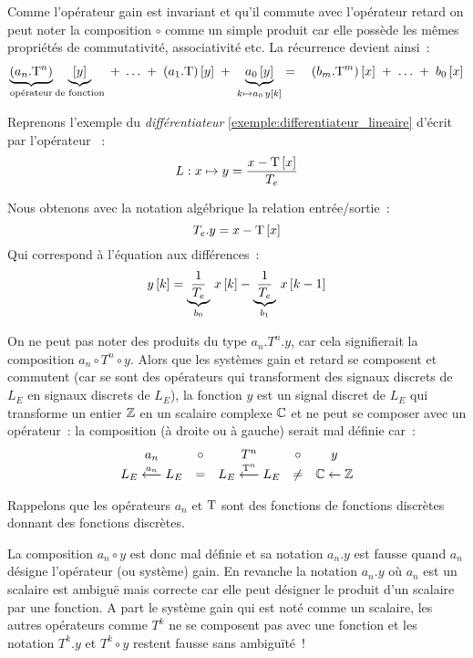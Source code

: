 Comme l'opérateur gain est invariant et qu'il commute avec l'opérateur
retard on peut noter la composition $\circ$ comme un simple produit
car elle possède les mêmes propriétés de commutativité, associativité
etc. La récurrence devient ainsi~:
\begin{eqnarray}
 \underbrace{\left(a_n.\mathrm{T}^n\right)}_{\text{opérateur}}\underbrace{\left[y\right]}_{\text{de fonction}}\; +\; \ldots \;+\; \left(a_1.\mathrm{T}\right)\left[y\right] \;+\; \underbrace{a_0\left[y\right]}_{k\mapsto a_0\,y\left[k\right]}  = \quad \left(b_m.\mathrm{T}^m\right)\left[x\right] \;+\; \ldots \;+\; b_0\left[x\right]
\end{eqnarray}

\begin{exemple}
  Reprenons l'exemple du \emph{différentiateur} \ref{exemple:differentiateur_lineaire} d'écrit par l'opérateur ~: $$L : x \mapsto y=\frac{x-\mathrm{T}\left[x\right]}{T_e}$$
  
  Nous obtenons avec la notation algébrique la relation entrée/sortie~:
  $$
  T_e.y = x - \mathrm{T}\left[x\right]
  $$
  Qui correspond à l'équation aux différences~:
  $$
  y\left[k\right] = \underbrace{\frac{1}{T_e}}_{b_0}\,x\left[k\right]-\underbrace{\frac{1}{T_e}}_{b_1}\,x\left[k-1\right]
  $$
  
\end{exemple}

\begin{remarque}
  On ne peut pas noter des produits du type $a_n.T^n.y$, car cela
  signifierait la composition $a_n\circ T^n\circ y$. Alors que les
  systèmes gain et retard se composent et commutent (car se sont des
  opérateurs qui transforment des signaux discrets de $L_E$ en signaux
  discrets de $L_E$), la fonction $y$ est un signal discret de $L_E$
  qui transforme un entier $\mathbb{Z}$ en un scalaire complexe $\mathbb{C}$ et ne
  peut se composer avec un opérateur~: la composition (à droite ou à
  gauche) serait mal définie car~:
  \begin{equation*}
    \begin{array}{ccccc}
      a_n   & \circ &   T^n  & \circ &  y \\
      L_E \overset{a_n}{\longleftarrow} L_E & =  & L_E \overset{\mathrm{T}^n}{\longleftarrow} L_E & \neq  & \mathbb{C} \leftarrow \mathbb{Z} 
    \end{array}
  \end{equation*}

  Rappelons que les opérateurs $a_n$ et $\mathrm{T}$ sont des
  \og{}fonctions de fonctions discrètes donnant des fonctions
  discrètes\fg{}.

  La composition $a_n\circ y$ est donc mal définie et sa notation
  $a_n.y$ est fausse quand $a_n$ désigne l'opérateur (ou système)
  gain. En revanche la notation $a_n.y$ où $a_n$ est un scalaire est
  ambiguë mais correcte car elle peut désigner le produit d'un
  scalaire par une fonction. A part le système gain qui est noté comme
  un scalaire, les autres opérateurs comme $T^k$ ne se composent pas
  avec une fonction et les notation $T^k.y$ et $T^k\circ y$ restent
  fausse sans ambiguïté~!
\end{remarque}



